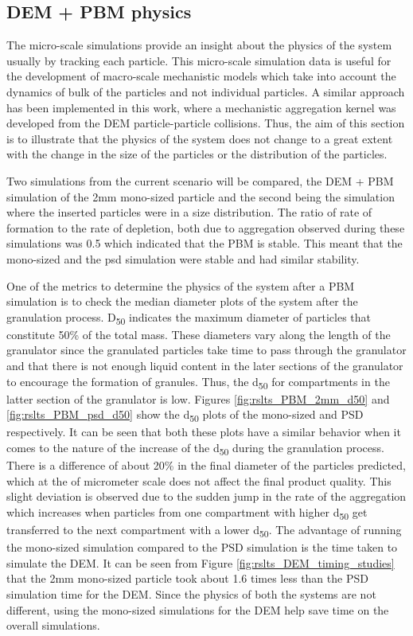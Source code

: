 \documentclass[preprint,11pt,authoryear]{elsarticle}
\begin{document}
\subsection{DEM + PBM physics}
The micro-scale simulations provide an insight about the physics of the system usually by tracking 
each particle. This micro-scale simulation data is useful for the development of macro-scale 
mechanistic models which take into account the dynamics of bulk of the particles and not individual 
particles. A similar approach has been implemented in this work, where a mechanistic aggregation 
kernel was developed from the DEM particle-particle collisions. Thus, the aim of this section is to 
illustrate that the physics of the system does not change to a great extent with the change in the size 
of the particles or the distribution of the particles.

Two simulations from the current scenario will be compared, the DEM + PBM simulation of the 2mm 
mono-sized particle and the second being the simulation where the inserted particles were in a size 
distribution. The ratio of rate of formation to the rate of depletion, both due to aggregation 
observed during these simulations was 0.5 which indicated that the PBM is stable. This meant that the
mono-sized and the psd simulation were stable and had similar stability.

One of the metrics to determine the physics of the system after a PBM simulation is to check the 
median diameter plots of the system after the granulation process. 
D\textsubscript{50} indicates the maximum diameter of particles that constitute 50\% of the total mass. 
These diameters vary along the length of the granulator since the granulated particles take time to 
pass through the granulator and that there is not enough liquid content in the later sections of 
the granulator to encourage the formation of granules. Thus, the d\textsubscript{50} for compartments 
in the latter section of the granulator is low. Figures \ref{fig:rslts_PBM_2mm_d50} and 
\ref{fig:rslts_PBM_psd_d50} show the d\textsubscript{50} plots of the mono-sized and PSD respectively. 
It can be seen that both these plots have a similar behavior when it comes to the nature of the 
increase of the d\textsubscript{50} during the granulation process. There is a difference of about 
20\% in the final diameter of the particles predicted, which at the of micrometer scale does not affect 
the final product quality. This slight deviation is observed due to the sudden jump in the 
rate of the aggregation which increases when particles from one compartment with higher 
d\textsubscript{50} get transferred to the next compartment with a lower d\textsubscript{50}. 
The advantage of running the mono-sized simulation compared to the PSD simulation is the 
time taken to simulate the DEM. It can be seen from Figure \ref{fig:rslts_DEM_timing_studies} that 
the 2mm mono-sized particle took about 1.6 times less than the PSD simulation time for the DEM. 
Since the physics of both the systems are not different, using the mono-sized simulations 
for the DEM help save time on the overall simulations. 
\end{document}
